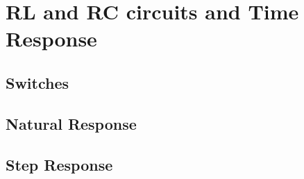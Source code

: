 \chapter{RL and RC circuits and Time Response}
\label{cha:rl_rc_timeresponse}
    \section{Switches}
    \section{Natural Response}
    \section{Step Response}

